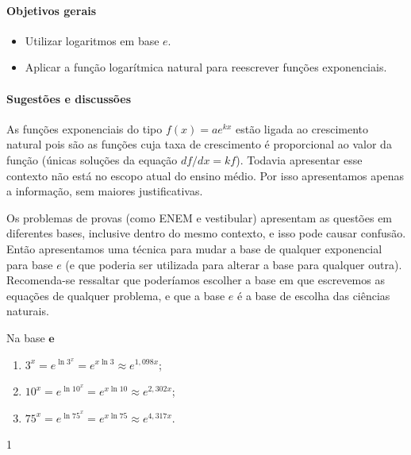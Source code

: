 \cleardoublepage
\def\currentcolor{session1}
\begin{texto}
{
	\paragraph{Objetivos gerais}
	\begin{itemize}
	\item Utilizar logaritmos em base $e$.
	\item Aplicar a função logarítmica natural para reescrever funções exponenciais.
	\end{itemize}

	\paragraph{Sugestões e discussões}
	As funções exponenciais do tipo $f(x) = a e^{kx}$ estão ligada ao crescimento natural pois são as funções cuja taxa de crescimento é proporcional ao valor da função (únicas soluções da equação $df/dx = k f$).  Todavia apresentar esse contexto não está no escopo atual do ensino médio. Por isso apresentamos apenas a informação, sem maiores justificativas.

	Os problemas de provas (como ENEM e vestibular) apresentam as questões em diferentes bases, inclusive dentro do mesmo contexto, e isso pode causar confusão. Então apresentamos uma técnica para mudar a base de qualquer exponencial para base $e$ (e que poderia ser utilizada para alterar a base para qualquer outra). Recomenda-se ressaltar que poderíamos escolher a base em que escrevemos as equações de qualquer problema, e que a base $e$ é a base de escolha das ciências naturais.
}
\end{texto}
\begin{answer}{Na base $\bm{e}$}
{
	\begin{enumerate}
\item $3^x = e^{\ln 3^x} = e^{x\ln 3} \approx e^{1{,}098 x}$;
\item $10^x = e^{\ln 10^x} = e^{x\ln 10} \approx e^{2{,}302 x}$;
\item $75^x = e^{\ln 75^x} = e^{x\ln 75} \approx e^{4{,}317 x}$.
\end{enumerate}
}{1}
\end{answer}
